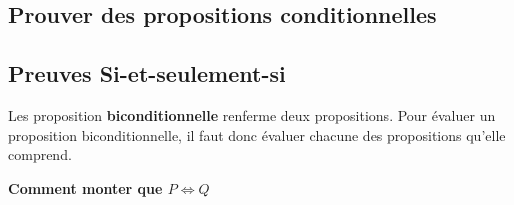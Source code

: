 \documentclass[16pt]{report}
\begin{document}
\begin{multicols*}{2}


            \chapter{Prouver des propositions conditionnelles}
            \section{Preuves Si-et-seulement-si}


            Les proposition \textbf{biconditionnelle} renferme deux propositions. Pour évaluer un proposition 
            biconditionnelle, il faut donc évaluer chacune des propositions qu'elle comprend. 

            \begin{center}
                \textbf{Comment monter que $P \Leftrightarrow Q$} 
            \noindent{}
            \end{center}



\end{multicols*}
\end{document}

